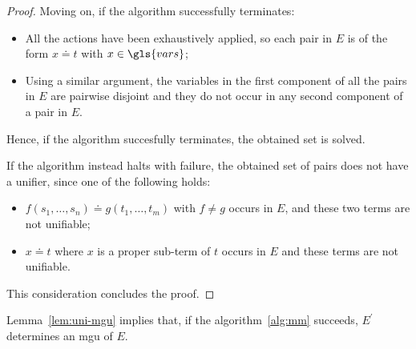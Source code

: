 \begin{proof}
    Moving on, if the algorithm successfully terminates:
    \begin{itemize}
        \item All the actions have been exhaustively applied, so each pair in \(E\) is of the form \(x \doteq t\) with \(x \in \gls{vars}\);
        \item Using a similar argument, the variables in the first component of all the pairs in \(E\) are pairwise disjoint and they do not occur in any second component of a pair in \(E\).
    \end{itemize}
    Hence, if the algorithm succesfully terminates, the obtained set is solved.

    If the algorithm instead halts with failure, the obtained set of pairs does not have a unifier, since one of the following holds:
    \begin{itemize}
        \item \(f(s_1,\dotsc,s_n) \doteq g(t_1,\dotsc,t_m)\) with \(f \ne g\) occurs in \(E\), and these two terms are not unifiable;
        \item \(x \doteq t\) where \(x\) is a proper sub-term of \(t\) occurs in \(E\) and these terms are not unifiable.
    \end{itemize}
    This consideration concludes the proof.
\end{proof}

\begin{cor}
    Lemma~\ref{lem:uni-mgu} implies that, if the algorithm~\ref{alg:mm} succeeds, \(E^\prime\) determines an \gls{mgu} of \(E\).
\end{cor}